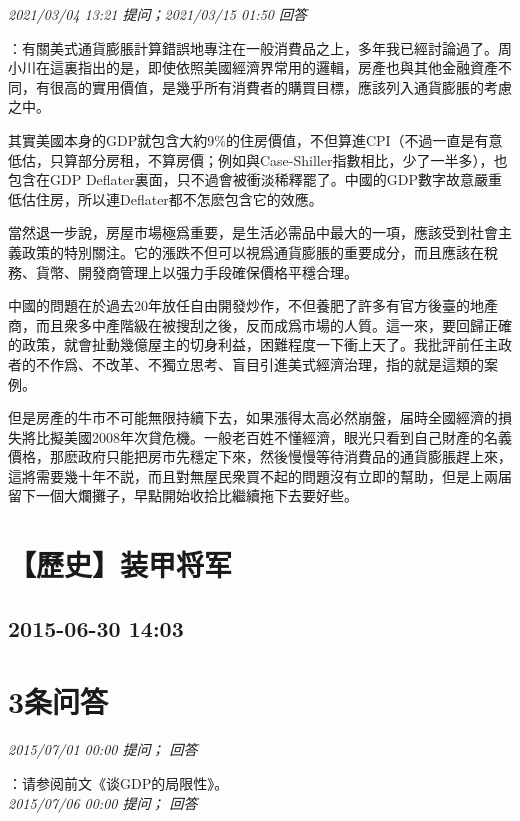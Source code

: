 \documentclass[twocolumn]{ctexart}
\begin{document}
\textit{\hfill\noindent\small 2021/03/04 13:21 提问；2021/03/15 01:50 回答}

：有關美式通貨膨脹計算錯誤地專注在一般消費品之上，多年我已經討論過了。周小川在這裏指出的是，即使依照美國經濟界常用的邏輯，房產也與其他金融資產不同，有很高的實用價值，是幾乎所有消費者的購買目標，應該列入通貨膨脹的考慮之中。

其實美國本身的GDP就包含大約9\%的住房價值，不但算進CPI（不過一直是有意低估，只算部分房租，不算房價；例如與Case-Shiller指數相比，少了一半多），也包含在GDP Deflater裏面，只不過會被衝淡稀釋罷了。中國的GDP數字故意嚴重低估住房，所以連Deflater都不怎麽包含它的效應。

當然退一步說，房屋市場極爲重要，是生活必需品中最大的一項，應該受到社會主義政策的特別關注。它的漲跌不但可以視爲通貨膨脹的重要成分，而且應該在稅務、貨幣、開發商管理上以强力手段確保價格平穩合理。

中國的問題在於過去20年放任自由開發炒作，不但養肥了許多有官方後臺的地產商，而且衆多中產階級在被搜刮之後，反而成爲市場的人質。這一來，要回歸正確的政策，就會扯動幾億屋主的切身利益，困難程度一下衝上天了。我批評前任主政者的不作爲、不改革、不獨立思考、盲目引進美式經濟治理，指的就是這類的案例。

但是房產的牛市不可能無限持續下去，如果漲得太高必然崩盤，届時全國經濟的損失將比擬美國2008年次貸危機。一般老百姓不懂經濟，眼光只看到自己財產的名義價格，那麽政府只能把房市先穩定下來，然後慢慢等待消費品的通貨膨脹趕上來，這將需要幾十年不説，而且對無屋民衆買不起的問題沒有立即的幫助，但是上兩届留下一個大爛攤子，早點開始收拾比繼續拖下去要好些。
\\


\section{【歷史】装甲将军}
\subsection{2015-06-30 14:03}


\section{3条问答}

\textit{\hfill\noindent\small 2015/07/01 00:00 提问； 回答}

：请参阅前文《谈GDP的局限性》。\\

\textit{\hfill\noindent\small 2015/07/06 00:00 提问； 回答}
\end{document}
